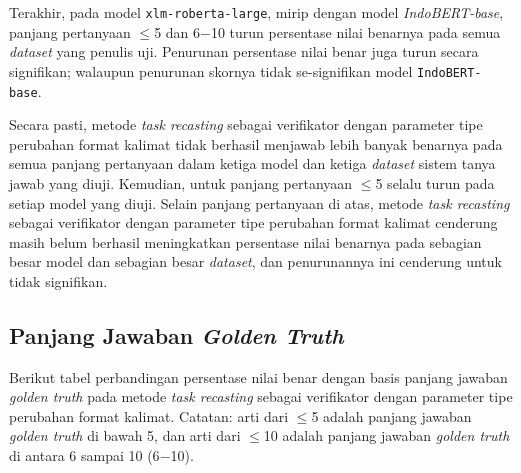 Terakhir, pada model \texttt{xlm-roberta-large}, mirip dengan model \emph{IndoBERT-base}, panjang pertanyaan $\leq$5 dan 6$-$10 turun persentase nilai benarnya pada semua \emph{dataset} yang penulis uji. Penurunan persentase nilai benar juga turun secara signifikan; walaupun penurunan skornya tidak se-signifikan model \texttt{IndoBERT-base}.

Secara pasti, metode \emph{task recasting} sebagai verifikator dengan parameter tipe perubahan format kalimat tidak berhasil menjawab lebih banyak benarnya pada semua panjang pertanyaan dalam ketiga model dan ketiga \emph{dataset} sistem tanya jawab yang diuji. Kemudian, untuk panjang pertanyaan $\leq$5 selalu turun pada setiap model yang diuji. Selain panjang pertanyaan di atas, metode \emph{task recasting} sebagai verifikator dengan parameter tipe perubahan format kalimat cenderung masih belum berhasil meningkatkan persentase nilai benarnya pada sebagian besar model dan sebagian besar \emph{dataset}, dan penurunannya ini cenderung untuk tidak signifikan.

\subsection{Panjang Jawaban \emph{Golden Truth}}
Berikut tabel perbandingan persentase nilai benar dengan basis panjang jawaban \emph{golden truth} pada metode \emph{task recasting} sebagai verifikator dengan parameter tipe perubahan format kalimat. Catatan: arti dari $\leq$5 adalah panjang jawaban \emph{golden truth} di bawah 5, dan arti dari $\leq$10 adalah panjang jawaban \emph{golden truth} di antara 6 sampai 10 (6$-$10).

